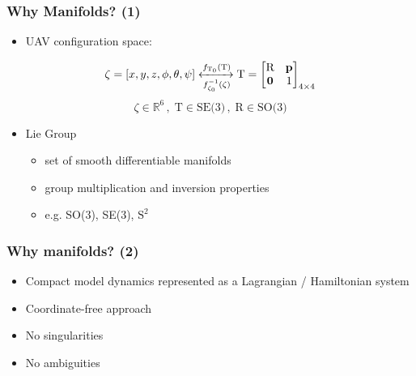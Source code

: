 \begin{frame}
	\frametitle{Why Manifolds? (1)}
	
	\begin{itemize}
		\item UAV configuration space:
	\end{itemize}
	\begin{equation}
		\zeta = [x, y, z, \phi, \theta, \psi] 
		\xleftrightarrow[f_{\zeta_0}^{-1}(\zeta)]{f_{\text{T}_0}(\text{T})}
		\text{T} = \begin{bmatrix}
		\text{R} & \textbf{p} \\
		\textbf{0} & 1
		\end{bmatrix}_{4\times 4} 
	\end{equation}
	\begin{equation}
		\zeta \in \mathbb{R}^6  \, , \; \text{T} \in \text{SE(3)} \, , \; \text{R} \in \text{SO(3)}
	\end{equation}
	
	\begin{itemize}
		\item Lie Group
		\begin{itemize}
			\item set of smooth differentiable manifolds
			\item group multiplication and inversion properties
			\item e.g. SO(3), SE(3), $\text{S}^2$
		\end{itemize}
	\end{itemize}
\end{frame}

\begin{frame}
	\frametitle{Why manifolds? (2)}
	
	\begin{itemize}
		\item Compact model dynamics represented as a Lagrangian / Hamiltonian system
		\item Coordinate-free approach
		\item No singularities
		\item No ambiguities
	\end{itemize}
\end{frame}